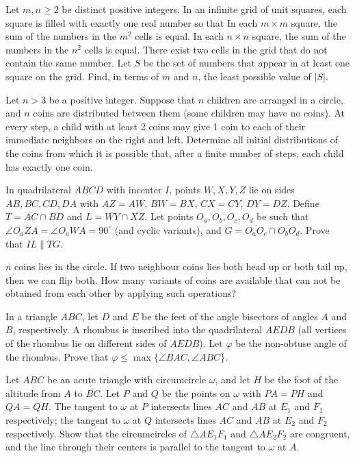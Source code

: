 \documentclass[11pt]{scrartcl}
\begin{document}
\begin{problem}[919147551255493]
Let $m, n \ge 2$ be distinct positive integers. In an infinite grid of unit squares, each square is filled with exactly one real number so that
In each $m \times m$ square, the sum of the numbers in the $m^2$ cells is equal.
In each $n \times n$ square, the sum of the numbers in the $n^2$ cells is equal.
There exist two cells in the grid that do not contain the same number.
Let $S$ be the set of numbers that appear in at least one square on the grid. Find, in terms of $m$ and $n$, the least possible value of $|S|$.
\end{problem}
\begin{problem}[931951248564234]
Let $n > 3$ be a positive integer. Suppose that $n$ children are arranged in a circle, and $n$ coins are distributed between them (some children may have no coins). At every step, a child with at least 2 coins may give 1 coin to each of their immediate neighbors on the right and left. Determine all initial distributions of the coins from which it is possible that, after a finite number of steps, each child has exactly one coin.
\end{problem}
\begin{problem}[934985329440054]
In quadrilateral $ABCD$ with incenter $I$, points $W,X,Y,Z$ lie on sides $AB, BC,CD,DA$ with $AZ=AW$, $BW=BX$, $CX=CY$, $DY=DZ$. Define $T=\overline{AC}\cap\overline{BD}$ and $L=\overline{WY}\cap\overline{XZ}$. Let points $O_a,O_b,O_c,O_d$ be such that $\angle O_aZA=\angle O_aWA=90^\circ$ (and cyclic variants), and $G=\overline{O_aO_c}\cap\overline{O_bO_d}$. Prove that $\overline{IL}\parallel\overline{TG}$.
\end{problem}
\begin{problem}[937132258882447]
	$n$ coins lies in the circle. If two neighbour coins lies both head up or both tail up, then we can flip both. How many variants of coins are available that can not be obtained from each other by applying such operations?
\end{problem}
\begin{problem}[939535945446129]
In a triangle $ABC$, let $D$ and $E$ be the feet of the angle bisectors of angles $A$ and $B$, respectively. A rhombus is inscribed into the quadrilateral $AEDB$ (all vertices of the rhombus lie on different sides of $AEDB$). Let $\varphi$ be the non-obtuse angle of the rhombus. Prove that $\varphi \le \max \{  \angle BAC, \angle ABC  \}$.
\end{problem}
\begin{problem}[942176258255049]
Let $ABC$ be an acute triangle with circumcircle $\omega$, and let $H$ be the foot of the altitude from $A$ to $\overline{BC}$. Let $P$ and $Q$ be the points on $\omega$ with $PA = PH$ and $QA = QH$. The tangent to $\omega$ at $P$ intersects lines $AC$ and $AB$ at $E_1$ and $F_1$ respectively; the tangent to $\omega$ at $Q$ intersects lines $AC$ and $AB$ at $E_2$ and $F_2$ respectively. Show that the circumcircles of $\triangle AE_1F_1$ and $\triangle AE_2F_2$ are congruent, and the line through their centers is parallel to the tangent to $\omega$ at $A$.
\end{problem}
\end{document}
